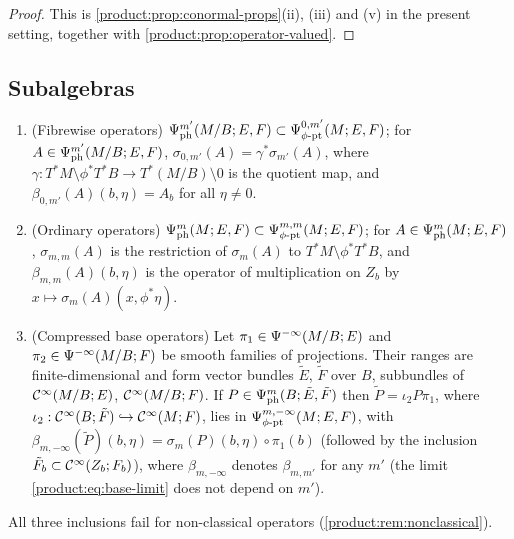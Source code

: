 \begin{proof}
This is \cref{product:prop:conormal-props}(ii), (iii) and (v) in the present
setting, together with \cref{product:prop:operator-valued}.
\end{proof}

\subsection{Subalgebras}

\begin{proposition}\label{product:prop:subalgebras}
\begin{enumerate}[label=\textup{(\roman*)}]
\item \textup{(Fibrewise operators)}
$\Psi^{m'}_{\mathrm{ph}}(M/B;E,F)\subset\Psi^{0,m'}_{\phi\text{-}\mathrm{pt}}(M;E,F)$;
for $A\in\Psi^{m'}_{\mathrm{ph}}(M/B;E,F)$, $\sigma_{0,m'}(A)=\gamma^*\sigma_{m'}(A)$, where
$\gamma:T^*M\setminus\phi^*T^*B\longrightarrow T^*(M/B)\setminus0$ is the quotient
map, and $\beta_{0,m'}(A)(b,\eta)=A_b$ for all $\eta\ne0$.
\item \textup{(Ordinary operators)}
$\Psi^{m}_{\mathrm{ph}}(M;E,F)\subset\Psi^{m,m}_{\phi\text{-}\mathrm{pt}}(M;E,F)$;
for $A\in\Psi^{m}_{\mathrm{ph}}(M;E,F)$, $\sigma_{m,m}(A)$ is the restriction of $\sigma_m(A)$ to $T^*M\setminus\phi^*T^*B$,
and $\beta_{m,m}(A)(b,\eta)$ is the operator of multiplication on $Z_b$ by
$x\longmapsto\sigma_m(A)(x,\phi^*\eta)$.
\item \textup{(Compressed base operators)} Let $\pi_1\in\Psi^{-\infty}(M/B;E)$ and
$\pi_2\in\Psi^{-\infty}(M/B;F)$ be smooth families of projections. Their ranges
are finite-dimensional and form vector bundles $\tilde E$, $\tilde F$ over $B$,
subbundles of $\mathcal{C}^\infty(M/B;E)$, $\mathcal{C}^\infty(M/B;F)$. If
$P\in\Psi^{m}_{\mathrm{ph}}(B;\tilde E,\tilde F)$
then $\tilde P=\iota_2P\pi_1$, where $\iota_2:\mathcal{C}^\infty(B;\tilde F)\hookrightarrow
\mathcal{C}^\infty(M;F)$, lies in $\Psi^{m,-\infty}_{\phi\text{-}\mathrm{pt}}(M;E,F)$, with
$\beta_{m,-\infty}(\tilde P)(b,\eta)=\sigma_m(P)(b,\eta)\circ\pi_1(b)$ (followed by the
inclusion $\tilde F_b\subset\mathcal{C}^\infty(Z_b;F_b)$), where $\beta_{m,-\infty}$ denotes
$\beta_{m,m'}$ for any $m'$ \textup{(}the limit \eqref{product:eq:base-limit} does
not depend on $m'$\textup{)}.
\end{enumerate}
All three inclusions fail for non-classical operators
\textup{(}\cref{product:rem:nonclassical}\textup{)}.
\end{proposition}

